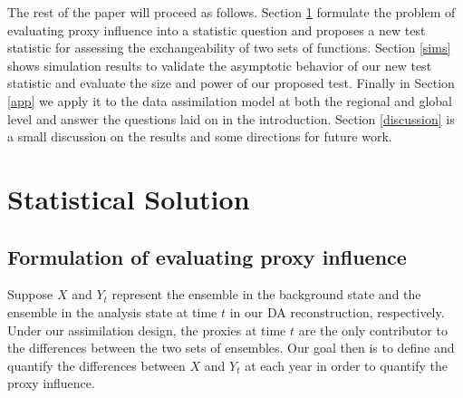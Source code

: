 \documentclass[12pt]{article}
\begin{document}
The rest of the paper will proceed as follows. Section \ref{sec:solution} formulate the problem of evaluating proxy influence into a statistic question and proposes a new test statistic for assessing the exchangeability of two sets of functions. Section \ref{sims} shows simulation results to validate the asymptotic behavior of our new test statistic  and evaluate the size and power of our proposed test. Finally in Section \ref{app} we apply it to the data assimilation model at both the regional and global level and answer the questions laid on in the introduction. Section \ref{discussion} is a small discussion on the results and some directions for future work.


\section{Statistical Solution} \label{sec:solution}
\subsection{Formulation of evaluating proxy influence} \label{sec:eval} 

Suppose $X$ and $Y_t$ represent the ensemble in the background state and the ensemble in the analysis state at time $t$ in our DA reconstruction, respectively.  Under our assimilation design, the proxies at time $t$ are the only contributor to the differences between the two sets of ensembles. Our goal then is to define and quantify the differences between $X$ and $Y_t$ at each year in order to quantify the proxy influence.
\end{document}
